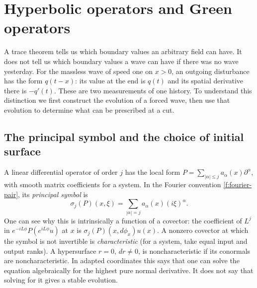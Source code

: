 \chapter{Hyperbolic operators and Green operators}\label{f:waves}

A trace theorem tells us which boundary values an arbitrary field can have. It does not tell us which boundary values a wave can have if there was no wave yesterday. For the massless wave of speed one on $x>0$, an outgoing disturbance has the form $q(t-x)$: its value at the end is $q(t)$ and its spatial derivative there is $-q'(t)$. These are two measurements of one history. To understand this distinction we first construct the evolution of a forced wave, then use that evolution to determine what can be prescribed at a cut.

\section{The principal symbol and the choice of initial surface}\label{f:wave-symbol}

A linear differential operator of order $j$ has the local form $P=\sum_{|\alpha|\leq j}a_\alpha(x)\partial^\alpha$, with smooth matrix coefficients for a system. In the Fourier convention \eqref{f:fourier-pair}, its \emph{principal symbol} is
\[
 \sigma_j(P)(x,\xi)=\sum_{|\alpha|=j}a_\alpha(x)(i\xi)^\alpha .
\]
One can see why this is intrinsically a function of a covector: the coefficient of $L^j$ in $e^{-iL\phi}P(e^{iL\phi}u)$ at $x$ is $\sigma_j(P)(x,d\phi_x)u(x)$. A nonzero covector at which the symbol is not invertible is \emph{characteristic} (for a system, take equal input and output ranks). A hypersurface $r=0$, $dr\ne0$, is noncharacteristic if its conormals are noncharacteristic. In adapted coordinates this says that one can solve the equation algebraically for the highest pure normal derivative. It does not say that solving for it gives a stable evolution.

